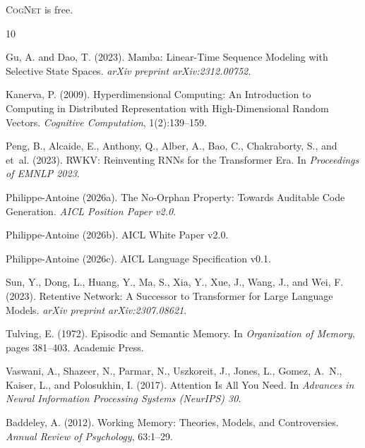 \documentclass[11pt]{article}
\newcommand{\cognet}{\textsc{CogNet}}
\begin{document}
\cognet{} is free.


\begin{thebibliography}{10}

Gu, A. and Dao, T. (2023).
\newblock Mamba: Linear-Time Sequence Modeling with Selective State Spaces.
\newblock \emph{arXiv preprint arXiv:2312.00752}.

Kanerva, P. (2009).
\newblock Hyperdimensional Computing: An Introduction to Computing in Distributed Representation with High-Dimensional Random Vectors.
\newblock \emph{Cognitive Computation}, 1(2):139--159.

Peng, B., Alcaide, E., Anthony, Q., Alber, A., Bao, C., Chakraborty, S., and et~al.
\newblock (2023).
\newblock RWKV: Reinventing RNNs for the Transformer Era.
\newblock In \emph{Proceedings of EMNLP 2023}.

Philippe-Antoine (2026a).
\newblock The No-Orphan Property: Towards Auditable Code Generation.
\newblock \emph{AICL Position Paper v2.0}.

Philippe-Antoine (2026b).
\newblock AICL White Paper v2.0.

Philippe-Antoine (2026c).
\newblock AICL Language Specification v0.1.

Sun, Y., Dong, L., Huang, Y., Ma, S., Xia, Y., Xue, J., Wang, J., and Wei, F.
\newblock (2023).
\newblock Retentive Network: A Successor to Transformer for Large Language Models.
\newblock \emph{arXiv preprint arXiv:2307.08621}.

Tulving, E. (1972).
\newblock Episodic and Semantic Memory.
\newblock In \emph{Organization of Memory}, pages 381--403. Academic Press.

Vaswani, A., Shazeer, N., Parmar, N., Uszkoreit, J., Jones, L., Gomez, A.~N., Kaiser, L., and Polosukhin, I.
\newblock (2017).
\newblock Attention Is All You Need.
\newblock In \emph{Advances in Neural Information Processing Systems (NeurIPS) 30}.

Baddeley, A. (2012).
\newblock Working Memory: Theories, Models, and Controversies.
\newblock \emph{Annual Review of Psychology}, 63:1--29.

\end{thebibliography}
\end{document}
